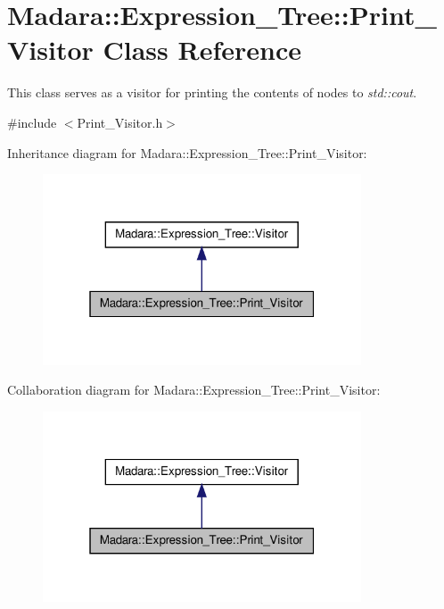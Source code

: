 \hypertarget{classMadara_1_1Expression__Tree_1_1Print__Visitor}{
\section{Madara::Expression\_\-Tree::Print\_\-Visitor Class Reference}
\label{d9/d82/classMadara_1_1Expression__Tree_1_1Print__Visitor}
}


This class serves as a visitor for printing the contents of nodes to {\itshape std::cout\/}.  




{\ttfamily \#include $<$Print\_\-Visitor.h$>$}



Inheritance diagram for Madara::Expression\_\-Tree::Print\_\-Visitor:
\nopagebreak
\begin{figure}[H]
\begin{center}
\leavevmode
\includegraphics[width=268pt]{dd/da7/classMadara_1_1Expression__Tree_1_1Print__Visitor__inherit__graph}
\end{center}
\end{figure}


Collaboration diagram for Madara::Expression\_\-Tree::Print\_\-Visitor:
\nopagebreak
\begin{figure}[H]
\begin{center}
\leavevmode
\includegraphics[width=268pt]{d0/d3d/classMadara_1_1Expression__Tree_1_1Print__Visitor__coll__graph}
\end{center}
\end{figure}
